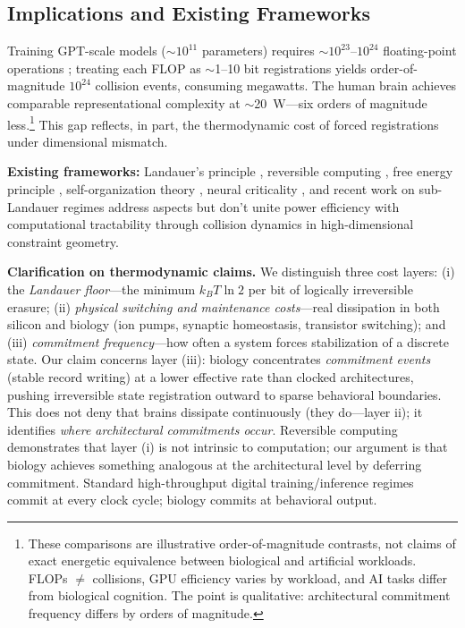 \documentclass[12pt]{article}
\begin{document}
\subsection{Implications and Existing Frameworks}

Training GPT-scale models ($\sim 10^{11}$ parameters) requires $\sim 10^{23}$--$10^{24}$ floating-point operations \cite{kaplan2020}; treating each FLOP as $\sim$1--10 bit registrations yields order-of-magnitude $10^{24}$ collision events, consuming megawatts. The human brain achieves comparable representational complexity at $\sim$20~W---six orders of magnitude less.\footnote{These comparisons are illustrative order-of-magnitude contrasts, not claims of exact energetic equivalence between biological and artificial workloads. FLOPs $\neq$ collisions, GPU efficiency varies by workload, and AI tasks differ from biological cognition. The point is qualitative: architectural commitment frequency differs by orders of magnitude.} This gap reflects, in part, the thermodynamic cost of forced registrations under dimensional mismatch.

\textbf{Existing frameworks:} Landauer's principle \cite{landauer1961}, reversible computing \cite{bennett1973,bennett1982}, free energy principle \cite{friston2010}, self-organization theory \cite{prigogine1984,kauffman1993}, neural criticality \cite{beggs2003}, and recent work on sub-Landauer regimes \cite{todd2025falsifiability,todd2025maxwell} address aspects but don't unite power efficiency with computational tractability through collision dynamics in high-dimensional constraint geometry.

\textbf{Clarification on thermodynamic claims.} We distinguish three cost layers: (i) the \textit{Landauer floor}---the minimum $k_B T \ln 2$ per bit of logically irreversible erasure; (ii) \textit{physical switching and maintenance costs}---real dissipation in both silicon and biology (ion pumps, synaptic homeostasis, transistor switching); and (iii) \textit{commitment frequency}---how often a system forces stabilization of a discrete state. Our claim concerns layer (iii): biology concentrates \textit{commitment events} (stable record writing) at a lower effective rate than clocked architectures, pushing irreversible state registration outward to sparse behavioral boundaries. This does not deny that brains dissipate continuously (they do---layer ii); it identifies \textit{where architectural commitments occur}. Reversible computing \cite{bennett1973} demonstrates that layer (i) is not intrinsic to computation; our argument is that biology achieves something analogous at the architectural level by deferring commitment. Standard high-throughput digital training/inference regimes commit at every clock cycle; biology commits at behavioral output.
\end{document}
